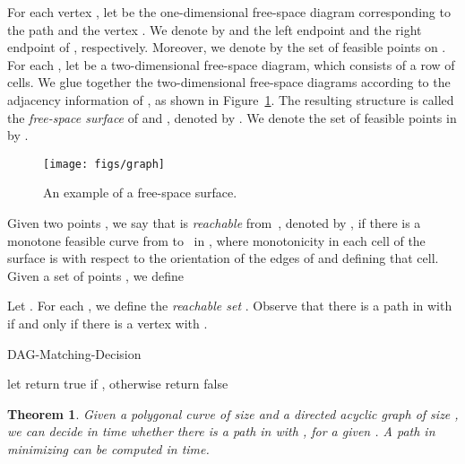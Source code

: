 \documentclass[12pt]{dalthesis}
\newtheorem{theorem}{Theorem}
\newcommand{\fs}{free-space }
\begin{document}
For each vertex , let  
be the one-dimensional \fs diagram corresponding 
to the path  and the vertex .
We denote by  and  the left endpoint and the right endpoint
of , respectively.
Moreover, we denote by  the set of feasible points on .
For each , let 
be a two-dimensional \fs diagram, which consists
of a row of  cells.
We glue together the two-dimensional \fs diagrams
according to the adjacency information of ,
as shown in Figure~\ref{fig:graph}.
The resulting structure is called the \emph{\fs surface} of  and ,
denoted by .
We denote the set of feasible points in  by . 

\begin{figure}[t]
	\centering
	\texttt{[image: figs/graph]}
	\caption{An example of a \fs surface.}
	\label{fig:graph}
\end{figure}

Given two points , 
we say that  is \emph{reachable} from~,
denoted by ,
if there is a monotone feasible curve from  to~ in ,
where monotonicity in each cell of the surface
is with respect to the orientation of the edges of  and 
defining that cell.
Given a set of points ,
we define

Let .
For each , 
we define the \emph{reachable set} .
Observe that there is a path  in  with 
if and only if there is a vertex  with .


\begin{algorithm} [h]
\caption {\sc DAG-Matching-Decision} \label{alg:graph}
\begin{algorithmic}[1]
	\vspace{0.5em}
	\baselineskip
		\STATE   \label{l:main}
	\ENDFOR 
	\STATE let 
	\STATE return {\sc true} if , otherwise return {\sc false}
\end{algorithmic}
\end{algorithm}

\begin{theorem} \label{thm:graph}
	Given a polygonal curve  of size  and a directed acyclic graph  of size , 
	we can decide in  time whether there is a path  in  
	with , for a given .
	A path  in  minimizing  can be computed in  time.
\end{theorem}
\end{document}
